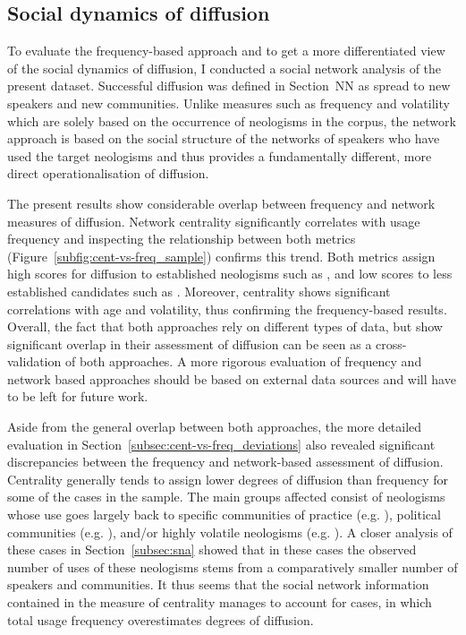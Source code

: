 \documentclass[
  a4paper,
  abstract=on,
  captions=tableabove
  ]{scrartcl}
\begin{document}


  \subsection{Social dynamics of diffusion}

    To evaluate the frequency-based approach and to get a more differentiated view of the social dynamics of diffusion, I conducted a social network analysis of the present dataset. Successful diffusion was defined in Section~NN as spread to new speakers and new communities. Unlike measures such as frequency and volatility which are solely based on the occurrence of neologisms in the corpus, the network approach is based on the social structure of the networks of speakers who have used the target neologisms and thus provides a fundamentally different, more direct operationalisation of diffusion.

    The present results show considerable overlap between frequency and network measures of diffusion. Network centrality significantly correlates with usage frequency and inspecting the relationship between both metrics (Figure~\ref{subfig:cent-vs-freq_sample}) confirms this trend. Both metrics assign high scores for diffusion to established neologisms such as , and low scores to less established candidates such as . Moreover, centrality shows significant correlations with age and volatility, thus confirming the frequency-based results. Overall, the fact that both approaches rely on different types of data, but show significant overlap in their assessment of diffusion can be seen as a cross-validation of both approaches. A more rigorous evaluation of frequency and network based approaches should be based on external data sources and will have to be left for future work.

    Aside from the general overlap between both approaches, the more detailed evaluation in Section~\ref{subsec:cent-vs-freq_deviations} also revealed significant discrepancies between the frequency and network-based assessment of diffusion. Centrality generally tends to assign lower degrees of diffusion than frequency for some of the cases in the sample. The main groups affected consist of neologisms whose use goes largely back to specific communities of practice (e.g. ), political communities (e.g. ), and/or highly volatile neologisms (e.g. ). A closer analysis of these cases in Section~\ref{subsec:sna} showed that in these cases the observed number of uses of these neologisms stems from a comparatively smaller number of speakers and communities. It thus seems that the social network information contained in the measure of centrality manages to account for cases, in which total usage frequency overestimates degrees of diffusion.
\end{document}
